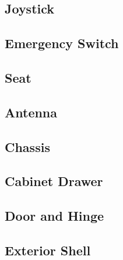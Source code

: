 \newcommand{\WorkingDrawing}[2]{
\begin{figure}[!ht]
    \centering
    \texttt{[image: \#1]}
    \caption{#2}
\end{figure}
}

\clearpage
\subsection{Joystick} \label{sec:WorkingDrawingJoystick}

\clearpage
\subsection{Emergency Switch} \label{sec:WorkingDrawingEmergencySwitch}

\clearpage
\subsection{Seat} \label{sec:WorkingDrawingSeat}

\clearpage
\subsection{Antenna} \label{sec:WorkingDrawingAntenna}

\clearpage
\subsection{Chassis} \label{sec:WorkingDrawingChassis}

\clearpage
\subsection{Cabinet Drawer} \label{sec:WorkingDrawingCabinetDrawer}

\clearpage
\subsection{Door and Hinge} \label{sec:WorkingDrawingDoorAndHinge}

\clearpage
\subsection{Exterior Shell} \label{sec:WorkingDrawingExteriorShell}

\clearpage
